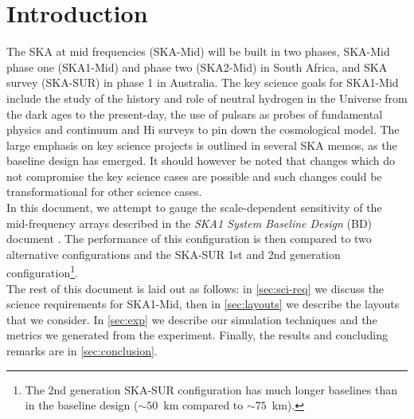 \documentclass[sfheadings,a4paper,times,9pt,floats,floatfix]{article}
\begin{document}
\section{Introduction}
The SKA at mid frequencies (SKA-Mid) will be built in two phases, SKA-Mid phase one (SKA1-Mid) and phase two (SKA2-Mid)
in South Africa, and SKA survey (SKA-SUR) in phase 1 in Australia. The key science goals for SKA1-Mid include the study of the
history and role of neutral hydrogen in the Universe from the dark ages to the present-day, the use of pulsars as probes of
fundamental physics \cite{bd} and continuum and H{\sc i} surveys to pin down the cosmological model. The large emphasis on key
science projects is outlined in several SKA memos, as the baseline design has emerged. It should however be noted that changes
which do not compromise the key science cases are possible and such changes could be transformational for other science 
cases. \\ In this document, we attempt to gauge the scale-dependent sensitivity of the mid-frequency arrays
described in the {\it SKA1 System Baseline Design} (BD) document \cite{bd}. The performance of this configuration is then compared
to two alternative configurations and the SKA-SUR 1st and 2nd
generation configuration\footnote{The 2nd generation SKA-SUR
  configuration has much longer baselines than in the baseline design
  ($\sim 50$~km compared to $\sim 75$~km).}.\\
The rest of this document is laid out as follows: in \autoref{sec:sci-req} we discuss the science requirements for SKA1-Mid, then
in \autoref{sec:layouts} we describe the layouts that we consider. In \autoref{sec:exp} we describe our simulation
techniques and the metrics we generated from the experiment. Finally, the results and concluding remarks are in
\autoref{sec:conclusion}.
\end{document}
